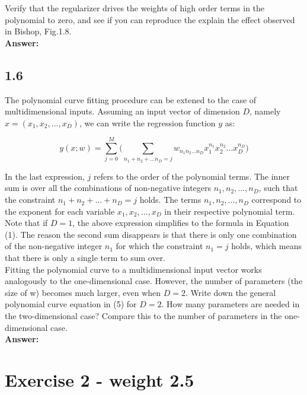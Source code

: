 \documentclass[a4paper]{article}
\begin{document}
Verify that the regularizer drives the weights of high order terms in the polynomial to zero, and see if you can reproduce the explain the effect observed in Bishop, Fig.1.8.\\

\textbf{Answer:}\\


\subsection*{1.6}

The polynomial curve fitting procedure can be extened to the case of multidimensional inputs. Assuming an input vector of dimension $D$, namely $x = (x_1,x_2,...,x_D)$, we can write the regression function $y$ as:

\begin{equation}
	y(x;w) = \sum_{j=0}^M \Bigg( \sum_{n_1+n_2+...n_D=j} w_{n_1 n_2...n_D}x_1^{n_1}x_2^{n_2} ... x_D^{n_D}\Bigg)
\end{equation}

In the last expression, $j$ refers to the order of the polynomial terms. The inner sum is over all the combinations of non-negative integers $n_1, n_2, ..., n_D$, such that the constraint $n_1+ n_2 + ... + n_D = j$ holds. The terms $n_1, n_2,..., n_D$ correspond to the exponent for each variable $x_1,x_2,...,x_D$ in their respective polynomial term.\\

Note that if $D = 1$, the above expression simplifies to the formula in Equation (1). The reason the second sum disappears is that there is only one combination of the non-negative integer $n_1$ for which the constraint $n_1 = j$ holds, which means that there is only a single term to sum over.\\

Fitting the polynomial curve to a multidimensional input vector works analogously to the one-dimensional case. However, the number of parameters (the size of w) becomes much larger, even when $D = 2$. Write down the general polynomial curve equation in (5) for $D = 2$. How many parameters are needed in the two-dimensional case? Compare this to the number of parameters in the one-dimensional case.\\


\textbf{Answer:}\\

\section*{Exercise 2 - weight 2.5}
\end{document}
